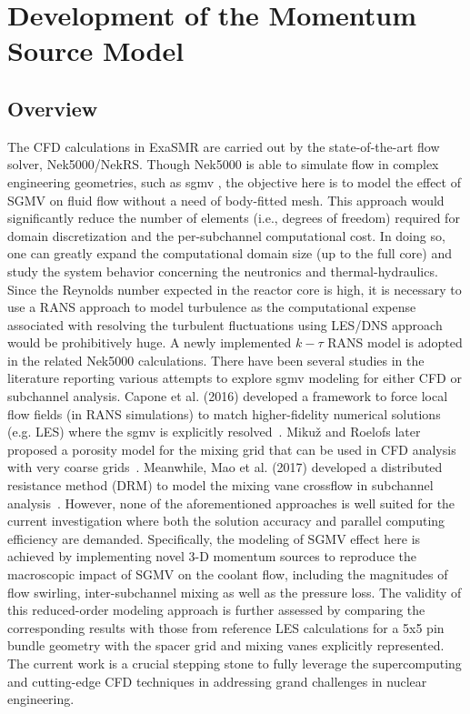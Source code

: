 \section{Development of the Momentum Source Model}
\label{sec:msm}

\subsection{Overview}
\label{sec:msm1}

The CFD calculations in ExaSMR are carried out by the state-of-the-art flow solver, Nek5000/NekRS.
Though Nek5000 is able to simulate flow in complex engineering geometries, such as \acf{sgmv} \cite{BUSCO2019144}, the objective here is to model the effect of SGMV on fluid flow without a need of body-fitted mesh.
This approach would significantly reduce the number of elements (i.e., degrees of freedom) required for domain discretization and the per-subchannel computational cost. In doing so, one can greatly expand the computational domain size (up to the full core) and study the system behavior concerning the neutronics and thermal-hydraulics.
Since the Reynolds number expected in the reactor core is high, it is necessary to use a RANS approach to model turbulence as the computational expense associated with resolving the turbulent fluctuations using LES/DNS approach would be prohibitively huge.
A newly implemented $k-\tau$ RANS model is adopted in the related Nek5000 calculations.
There have been several studies in the literature reporting various attempts to explore \ac{sgmv} modeling for either CFD or subchannel analysis.
Capone et al. (2016) developed a framework to force local flow fields (in RANS simulations) to match higher-fidelity numerical solutions (e.g. LES) where the \ac{sgmv} is explicitly resolved~\cite{Capone2016}.
Mikuž and Roelofs later proposed a porosity model for the mixing grid that can be used in CFD analysis with very coarse grids~\cite{Mikuz2020}.
Meanwhile, Mao et al. (2017) developed a distributed resistance method (DRM) to model the mixing vane crossflow in subchannel analysis~\cite{Mao2017}.
However, none of the aforementioned approaches is well suited for the current investigation where both the solution accuracy and parallel computing efficiency are demanded.
Specifically, the modeling of SGMV effect here is achieved by implementing novel 3-D momentum sources to reproduce the macroscopic impact of SGMV on the coolant flow, including the magnitudes of flow swirling, inter-subchannel mixing as well as the pressure loss.
The validity of this reduced-order modeling approach is further assessed by comparing the corresponding results with those from reference LES calculations for a 5x5 pin bundle geometry with the spacer grid and mixing vanes explicitly represented.
The current work is a crucial stepping stone to fully leverage the supercomputing and cutting-edge CFD techniques in addressing grand challenges in nuclear engineering.


